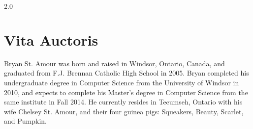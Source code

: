 \documentclass[oneside]{book}
\newcommand{\uwindoublespacelen}{2.0}
\newcommand{\uwindefaultspacelen}{\uwindoublespacelen}
\newenvironment{uwindefaultspaceenv}%
{\begin{spacing}{\uwindefaultspacelen}}%
  {\end{spacing}}
\begin{document}
\begin{uwindefaultspaceenv}

\tableofcontents

\listoffigures
\clearpage

\listoftables
\clearpage














\chapter*{Vita Auctoris}

Bryan St. Amour was born and raised in Windsor, Ontario, Canada, and graduated from F.J. Brennan
Catholic High School in 2005. Bryan completed his undergraduate degree in Computer Science from
the University of Windsor in 2010, and expects to complete his Master's degree in Computer Science
from the same institute in Fall 2014. He currently resides in Tecumseh, Ontario with his wife
Chelsey St. Amour, and their four guinea pigs: Squeakers, Beauty, Scarlet, and Pumpkin.

\end{uwindefaultspaceenv}
\end{document}

